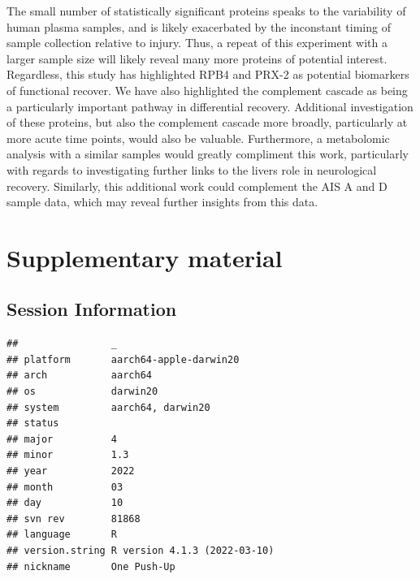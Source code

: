 \documentclass[
]{article}
\newcommand{\beginsupplement}{\setcounter{table}{0}  \renewcommand{\thetable}{S\arabic{table}} \setcounter{figure}{0} \renewcommand{\thefigure}{S\arabic{figure}}}
\begin{document}
\begin{landscape}
\begin{landscape}
The small number of statistically significant proteins speaks to the variability of human plasma samples, and is likely exacerbated by the inconstant timing of sample collection relative to injury.
Thus, a repeat of this experiment with a larger sample size will likely reveal many more proteins of potential interest.
Regardless, this study has highlighted RPB4 and PRX-2 as potential biomarkers of functional recover.
We have also highlighted the complement cascade as being a particularly important pathway in differential recovery.
Additional investigation of these proteins, but also the complement cascade more broadly, particularly at more acute time points, would also be valuable.
Furthermore, a metabolomic analysis with a similar samples would greatly compliment this work, particularly with regards to investigating further links to the livers role in neurological recovery.
Similarly, this additional work could complement the AIS A and D sample data, which may reveal further insights from this data.

\newpage

\hypertarget{sup-data}{%
\section*{Supplementary material}\label{sup-data}}

\beginsupplement

\hypertarget{session-information}{%
\subsection{Session Information}\label{session-information}}

\begin{verbatim}
##                _                           
## platform       aarch64-apple-darwin20      
## arch           aarch64                     
## os             darwin20                    
## system         aarch64, darwin20           
## status                                     
## major          4                           
## minor          1.3                         
## year           2022                        
## month          03                          
## day            10                          
## svn rev        81868                       
## language       R                           
## version.string R version 4.1.3 (2022-03-10)
## nickname       One Push-Up
\end{verbatim}


\end{landscape}
\end{landscape}
\end{document}
